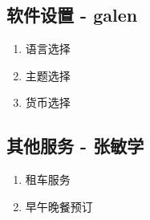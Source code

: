 \documentclass[18pt]{article}
\begin{document}
	\subsection{软件设置 - galen}
	\begin{enumerate}
		\item 语言选择
		\item 主题选择
		\item 货币选择
	\end{enumerate}
	
	\subsection{其他服务 - 张敏学}
	\begin{enumerate}
		\item 租车服务
		\item 早午晚餐预订
	\end{enumerate}

	
\end{document}
